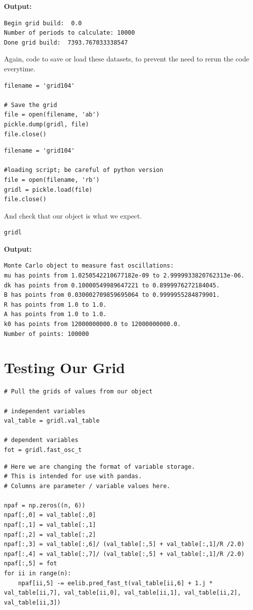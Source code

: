 \documentclass{article}
\begin{document}
\textbf{Output:}\begin{verbatim}
Begin grid build:  0.0
Number of periods to calculate: 10000
Done grid build:  7393.767033338547

\end{verbatim}

Again, code to save or load these datasets, to prevent the need to rerun the code everytime.

\begin{lstlisting}
filename = 'grid104'

# Save the grid
file = open(filename, 'ab')
pickle.dump(gridl, file)
file.close()\end{lstlisting}

\begin{lstlisting}
filename = 'grid104'

#loading script; be careful of python version
file = open(filename, 'rb')    
gridl = pickle.load(file)
file.close()\end{lstlisting}

And check that our object is what we expect.

\begin{lstlisting}
gridl\end{lstlisting}

\textbf{Output:}\begin{verbatim}
Monte Carlo object to measure fast oscillations:
mu has points from 1.0250542210677182e-09 to 2.9999933820762313e-06.
dk has points from 0.10000549989647221 to 0.8999976272184045.
B has points from 0.030002709859695064 to 0.9999955284879901.
R has points from 1.0 to 1.0.
A has points from 1.0 to 1.0.
k0 has points from 12000000000.0 to 12000000000.0.
Number of points: 100000
\end{verbatim}

\section{Testing Our Grid}

\begin{lstlisting}
# Pull the grids of values from our object

# independent variables
val_table = gridl.val_table

# dependent variables
fot = gridl.fast_osc_t\end{lstlisting}

\begin{lstlisting}
# Here we are changing the format of variable storage.
# This is intended for use with pandas.
# Columns are parameter / variable values here.

npaf = np.zeros((n, 6))
npaf[:,0] = val_table[:,0]
npaf[:,1] = val_table[:,1]
npaf[:,2] = val_table[:,2]
npaf[:,3] = val_table[:,6]/ (val_table[:,5] + val_table[:,1]/R /2.0)
npaf[:,4] = val_table[:,7]/ (val_table[:,5] + val_table[:,1]/R /2.0)
npaf[:,5] = fot
for ii in range(n):
    npaf[ii,5] -= eelib.pred_fast_t(val_table[ii,6] + 1.j * val_table[ii,7], val_table[ii,0], val_table[ii,1], val_table[ii,2], val_table[ii,3])\end{lstlisting}
\end{document}
